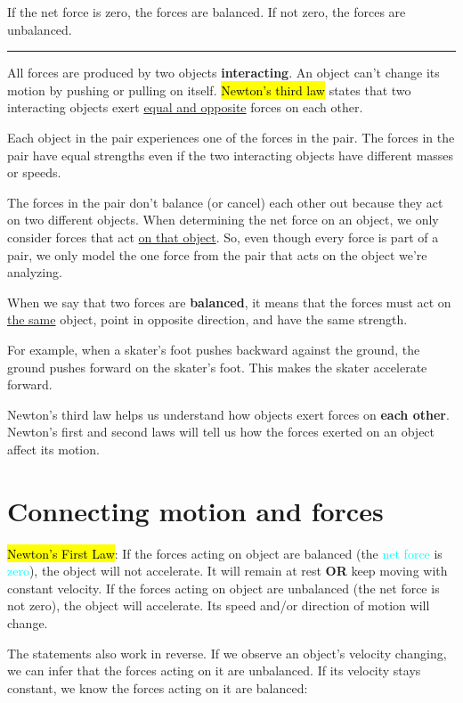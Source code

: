 If the net force is zero, the forces are balanced. If not zero, the forces are unbalanced.

\noindent\rule{\textwidth}{0.4pt}

All forces are produced by two objects \textbf{interacting}. An object can’t change its motion by pushing or pulling on itself. \hl{Newton's third law} states that two interacting objects exert \underline{equal and opposite} forces on each other.

Each object in the pair experiences one of the forces in the pair. The forces in the pair have equal strengths even if the two interacting objects have different masses or speeds.

The forces in the pair don't balance (or cancel) each other out because they act on two different objects. When determining the net force on an object, we only consider forces that act \underline{on that object}. So, even though every force is part of a pair, we only model the one force from the pair that acts on the object we're analyzing.

When we say that two forces are \textbf{balanced}, it means that the forces must act on \underline{the same} object, point in opposite direction, and have the same strength.

For example, when a skater’s foot pushes backward against the ground, the ground pushes forward on the skater’s foot. This makes the skater accelerate forward.

\vspace{.5cm}

Newton's third law helps us understand how objects exert forces on \textbf{each other}. Newton's first and second laws will tell us how the forces exerted on an object affect its motion. 

\section{Connecting motion and forces}

\hl{Newton's First Law}: If the forces acting on object are balanced (the \textcolor{cyan}{net force} is \textcolor{cyan}{zero}), the object will not accelerate. It will remain at rest \textbf{OR} keep moving with constant velocity. If the forces acting on object are unbalanced (the net force is not zero), the object will accelerate. Its speed and/or direction of motion will change.

The statements also work in reverse. If we observe an object’s velocity changing, we can infer that the forces acting on it are unbalanced. If its velocity stays constant, we know the forces acting on it are balanced:

